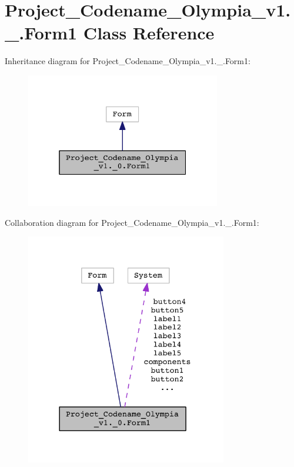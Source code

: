 \hypertarget{classProject__Codename__Olympia__v1_1_1__0_1_1Form1}{}\section{Project\+\_\+\+Codename\+\_\+\+Olympia\+\_\+v1.\+\_.\+Form1 Class Reference}
\label{classProject__Codename__Olympia__v1_1_1__0_1_1Form1}


Inheritance diagram for Project\+\_\+\+Codename\+\_\+\+Olympia\+\_\+v1.\+\_.\+Form1\+:\nopagebreak
\begin{figure}[H]
\begin{center}
\leavevmode
\includegraphics[width=241pt]{classProject__Codename__Olympia__v1_1_1__0_1_1Form1__inherit__graph}
\end{center}
\end{figure}


Collaboration diagram for Project\+\_\+\+Codename\+\_\+\+Olympia\+\_\+v1.\+\_.\+Form1\+:\nopagebreak
\begin{figure}[H]
\begin{center}
\leavevmode
\includegraphics[width=249pt]{classProject__Codename__Olympia__v1_1_1__0_1_1Form1__coll__graph}
\end{center}
\end{figure}
